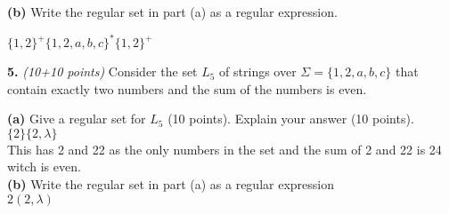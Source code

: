 \documentclass[12pt]{article}
\begin{document}
{\bf (b)} Write the regular set in part (a) as a regular expression.

$\{1,2\}^+\{1, 2, a, b, c \}^* \{1,2\}^+$

\vspace{0.1in}
{\bf 5.} {\em (10+10 points)}
Consider the set $L_5$ of strings over
$\Sigma = \{ 1, 2, a, b, c \}$ 
that contain exactly two numbers and the sum of the numbers is even.

{\bf (a)} Give a regular set for $L_5$ (10 points). Explain your answer
(10 points).\\
$\{2\}\{2, \lambda\}$\\ This has 2 and 22 as the only numbers in the set and the sum of 2 and 22 is 24 witch is even.\\
{\bf (b)} Write the regular set in part (a) as a regular expression\\
$2(2,\lambda)$
\end{document}
